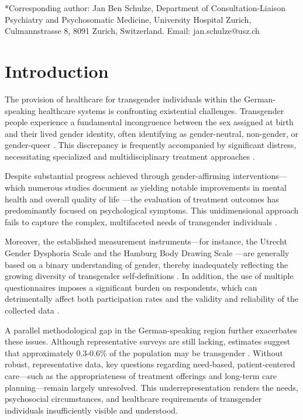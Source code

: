 \documentclass[12pt,a4paper]{article}
\begin{document}
\vspace{1em}
\noindent
*Corresponding author: Jan Ben Schulze, Department of Consultation-Liaison Psychiatry and Psychosomatic Medicine, University Hospital Zurich, Culmannstrasse 8, 8091 Zurich, Switzerland. Email: jan.schulze@usz.ch

\tableofcontents

\newpage

\section{Introduction}

The provision of healthcare for transgender individuals within the German-speaking healthcare systems is confronting existential challenges. Transgender people experience a fundamental incongruence between the sex assigned at birth and their lived gender identity, often identifying as gender-neutral, non-gender, or gender-queer \parencite{Arcelus2017, Richards2017, Richards2016}. This discrepancy is frequently accompanied by significant distress, necessitating specialized and multidisciplinary treatment approaches \parencite{Beek2015}.

Despite substantial progress achieved through gender-affirming interventions---which numerous studies document as yielding notable improvements in mental health and overall quality of life \parencite{Coleman2012, Wylie2014, Dhejne2016, Jones2016, Marshall2016}---the evaluation of treatment outcomes has predominantly focused on psychological symptoms. This unidimensional approach fails to capture the complex, multifaceted needs of transgender individuals \parencite{Bouman2016, Bouman2017, Heylens2014, Murad2010, Witcomb2018}.

Moreover, the established measurement instruments---for instance, the Utrecht Gender Dysphoria Scale \parencite{CohenKettenis1997} and the Hamburg Body Drawing Scale \parencite{Becker2016}---are generally based on a binary understanding of gender, thereby inadequately reflecting the growing diversity of transgender self-definitions \parencite{Beek2015, Clarke2018}. In addition, the use of multiple questionnaires imposes a significant burden on respondents, which can detrimentally affect both participation rates and the validity and reliability of the collected data \parencite{Rolstad2011, Turner2007, Diehr2005, Snyder2007}.

A parallel methodological gap in the German-speaking region further exacerbates these issues. Although representative surveys are still lacking, estimates suggest that approximately 0.3-0.6\% of the population may be transgender \parencite{Beek2015, Arcelus2017}. Without robust, representative data, key questions regarding need-based, patient-centered care---such as the appropriateness of treatment offerings and long-term care planning---remain largely unresolved. This underrepresentation renders the needs, psychosocial circumstances, and healthcare requirements of transgender individuals insufficiently visible and understood.
\end{document}
